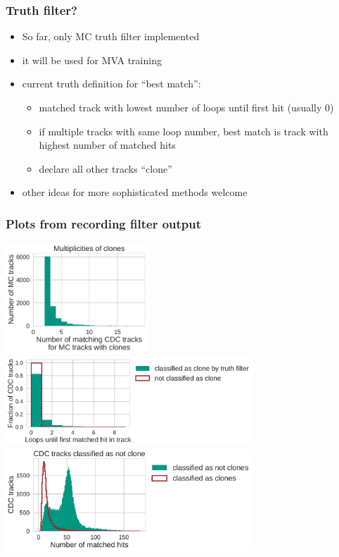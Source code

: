 \documentclass[18pt]{beamer}
\begin{document}
\begin{frame}
  \frametitle{Truth filter?}
  \begin{itemize}
  \item So far, only MC truth filter implemented
  \item it will be used for MVA training
  \item current truth definition for ``best match'':
    \begin{itemize}
    \item matched track with lowest number of loops until first hit
      (usually 0)
    \item if multiple tracks with same loop number, best match is track with highest number of matched hits
    \item declare all other tracks ``clone''
    \end{itemize}
  \item other ideas for more sophisticated methods welcome
\end{itemize}
\end{frame}


\begin{frame}[allowframebreaks]
  \frametitle{Plots from recording filter output}   \includegraphics[width=0.4\textwidth]{figures/clone_multiplicities.pdf}\\
  \includegraphics[width=0.7\textwidth]{figures/loop_numbers.pdf}\\
  \includegraphics[width=0.7\textwidth]{figures/matched_hits.pdf}\\
\end{frame}
\end{document}
